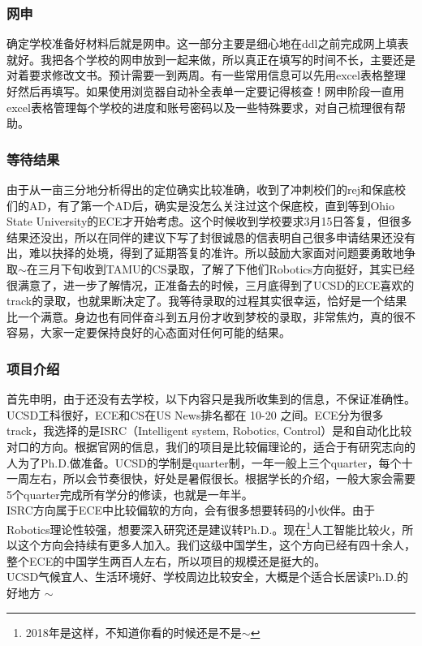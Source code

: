 \documentclass[a4paper,UTF8]{book}
\begin{document}
        \subsubsection*{网申}
        确定学校准备好材料后就是网申。这一部分主要是细心地在ddl之前完成网上填表就好。我把各个学校的网申放到一起来做，所以真正在填写的时间不长，主要还是对着要求修改文书。预计需要一到两周。有一些常用信息可以先用excel表格整理好然后再填写。如果使用浏览器自动补全表单一定要记得核查！网申阶段一直用excel表格管理每个学校的进度和账号密码以及一些特殊要求，对自己梳理很有帮助。

        \subsubsection*{等待结果}
        由于从一亩三分地分析得出的定位确实比较准确，收到了冲刺校们的rej和保底校们的AD，有了第一个AD后，确实是没怎么关注过这个保底校，直到等到Ohio State University的ECE才开始考虑。这个时候收到学校要求3月15日答复，但很多结果还没出，所以在同伴的建议下写了封很诚恳的信表明自己很多申请结果还没有出，难以抉择的处境，得到了延期答复的准许。所以鼓励大家面对问题要勇敢地争取$\sim$在三月下旬收到TAMU的CS录取，了解了下他们Robotics方向挺好，其实已经很满意了，进一步了解情况，正准备去的时候，三月底得到了UCSD的ECE喜欢的track的录取，也就果断决定了。我等待录取的过程其实很幸运，恰好是一个结果比一个满意。身边也有同伴奋斗到五月份才收到梦校的录取，非常焦灼，真的很不容易，大家一定要保持良好的心态面对任何可能的结果。

        \subsubsection*{项目介绍}
        首先申明，由于还没有去学校，以下内容只是我所收集到的信息，不保证准确性。\\
        UCSD工科很好，ECE和CS在US News排名都在 10-20 之间。ECE分为很多track，我选择的是ISRC（Intelligent system, Robotics, Control）是和自动化比较对口的方向。根据官网的信息，我们的项目是比较偏理论的，适合于有研究志向的人为了Ph.D.做准备。UCSD的学制是quarter制，一年一般上三个quarter，每个十一周左右，所以会节奏很快，好处是暑假很长。根据学长的介绍，一般大家会需要5个quarter完成所有学分的修读，也就是一年半。\\
        ISRC方向属于ECE中比较偏软的方向，会有很多想要转码的小伙伴。由于Robotics理论性较强，想要深入研究还是建议转Ph.D.。现在\footnote{2018年是这样，不知道你看的时候还是不是$\sim$}人工智能比较火，所以这个方向会持续有更多人加入。我们这级中国学生，这个方向已经有四十余人，整个ECE的中国学生两百人左右，所以项目的规模还是挺大的。\\
        UCSD气候宜人、生活环境好、学校周边比较安全，大概是个适合长居读Ph.D.的好地方 $\sim$
\end{document}
